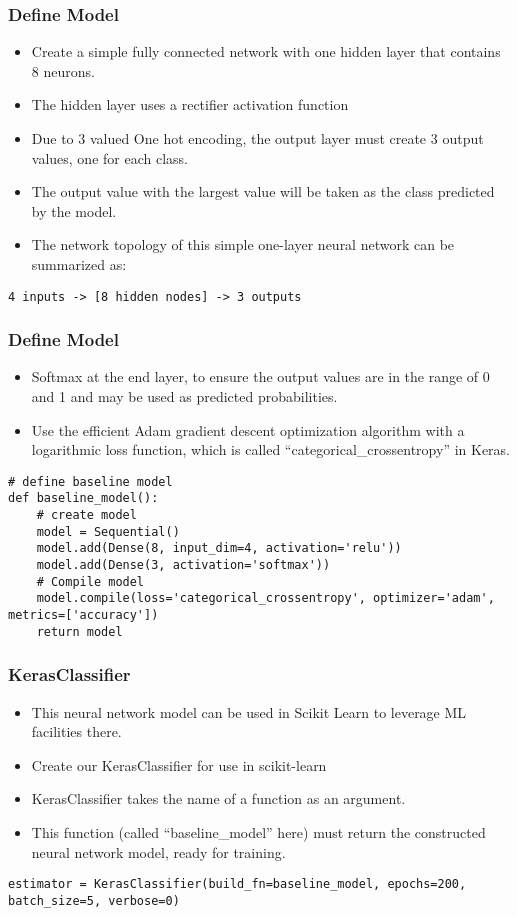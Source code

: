 \begin{frame}[fragile] \frametitle{ Define Model}
 \begin{itemize}
 \item  Create a simple fully connected network with one hidden layer that contains 8 neurons.
 \item The hidden layer uses a rectifier activation function
 \item Due to 3 valued One hot encoding, the output layer must create 3 output values, one for each class. 
 \item The output value with the largest value will be taken as the class predicted by the model.
 \item The network topology of this simple one-layer neural network can be summarized as:
 \end{itemize}
 \begin{lstlisting}
4 inputs -> [8 hidden nodes] -> 3 outputs
\end{lstlisting}
\end{frame}

\begin{frame}[fragile] \frametitle{ Define Model}
 \begin{itemize}
 \item  Softmax at the end layer,  to ensure the output values are in the range of 0 and 1 and may be used as predicted probabilities.
 \item Use the efficient Adam gradient descent optimization algorithm with a logarithmic loss function, which is called ``categorical\_crossentropy'' in Keras.
 \end{itemize}
 \begin{lstlisting}
# define baseline model
def baseline_model():
	# create model
	model = Sequential()
	model.add(Dense(8, input_dim=4, activation='relu'))
	model.add(Dense(3, activation='softmax'))
	# Compile model
	model.compile(loss='categorical_crossentropy', optimizer='adam', metrics=['accuracy'])
	return model
\end{lstlisting}
\end{frame}


\begin{frame}[fragile] \frametitle{KerasClassifier}
 \begin{itemize}
 \item  This neural network model can be used in Scikit Learn to leverage ML facilities there.
 \item Create our KerasClassifier for use in scikit-learn
 \item KerasClassifier takes the name of a function as an argument. 
 \item This function (called ``baseline\_model'' here) must return the constructed neural network model, ready for training.
 \end{itemize}
 \begin{lstlisting}
estimator = KerasClassifier(build_fn=baseline_model, epochs=200, batch_size=5, verbose=0)
\end{lstlisting}
\end{frame}

